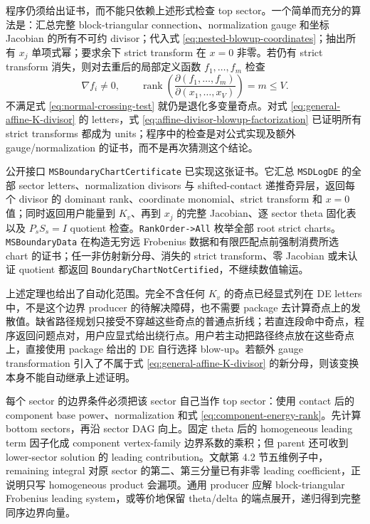 \documentclass[11pt,a4paper]{ctexart}
\begin{document}
程序仍须给出证书，而不能只依赖上述形式检查 top sector。一个简单而充分的算法是：汇总完整 block-triangular connection、normalization gauge 和坐标 Jacobian 的所有不可约 divisor；代入式 \eqref{eq:nested-blowup-coordinates}；抽出所有 $x_j$ 单项式幂；要求余下 strict transform 在 $x=0$ 非零。若仍有 strict transform 消失，则对去重后的局部定义函数 $f_1,\ldots,f_m$ 检查
\begin{equation}
 \nabla f_i\neq0,
 \qquad
 \operatorname{rank}\!\left(\frac{\partial(f_1,\ldots,f_m)}
 {\partial(x_1,\ldots,x_V)}\right)=m\leq V.
 \label{eq:normal-crossing-test}
\end{equation}
不满足式 \eqref{eq:normal-crossing-test} 就仍是退化多变量奇点。对式 \eqref{eq:general-affine-K-divisor} 的 letters，式 \eqref{eq:affine-divisor-blowup-factorization} 已证明所有 strict transforms 都成为 units；程序中的检查是对公式实现及额外 gauge/normalization 的证书，而不是再次猜测这个结论。

公开接口 \texttt{MSBoundaryChartCertificate} 已实现这张证书。它汇总 \texttt{MSDLogDE} 的全部 sector letters、normalization divisors 与 shifted-contact 递推奇异层，返回每个 divisor 的 dominant rank、coordinate monomial、strict transform 和 $x=0$ 值；同时返回用户能量到 $K_v$、再到 $x_j$ 的完整 Jacobian、逐 sector theta 固化表以及 $P_sS_s=I$ quotient 检查。\texttt{RankOrder->All} 枚举全部 root strict charts。\texttt{MSBoundaryData} 在构造无穷远 Frobenius 数据和有限匹配点前强制消费所选 chart 的证书；任一非仿射新分母、消失的 strict transform、零 Jacobian 或未认证 quotient 都返回 \texttt{BoundaryChartNotCertified}，不继续数值输运。

上述定理也给出了自动化范围。完全不含任何 $K_v$ 的奇点已经显式列在 DE letters 中，不是这个边界 producer 的待解决障碍，也不需要 package 去计算奇点上的发散值。缺省路径规划只接受不穿越这些奇点的普通点折线；若直连段命中奇点，程序返回问题点对，用户应显式给出绕行点。用户若主动把路径终点放在这些奇点上，直接使用 package 给出的 DE 自行选择 blow-up。若额外 gauge transformation 引入了不属于式 \eqref{eq:general-affine-K-divisor} 的新分母，则该变换本身不能自动继承上述证明。

每个 sector 的边界条件必须把该 sector 自己当作 top sector：使用 contact 后的 component base power、normalization 和式 \eqref{eq:component-energy-rank}。先计算 bottom sectors，再沿 sector DAG 向上。固定 theta 后的 homogeneous leading term 因子化成 component vertex-family 边界系数的乘积；但 parent 还可收到 lower-sector solution 的 leading contribution。文献第 4.2 节五维例子中，remaining integral 对原 sector 的第二、第三分量已有非零 leading coefficient，正说明只写 homogeneous product 会漏项。通用 producer 应解 block-triangular Frobenius leading system，或等价地保留 theta/delta 的端点展开，递归得到完整同序边界向量。
\end{document}
